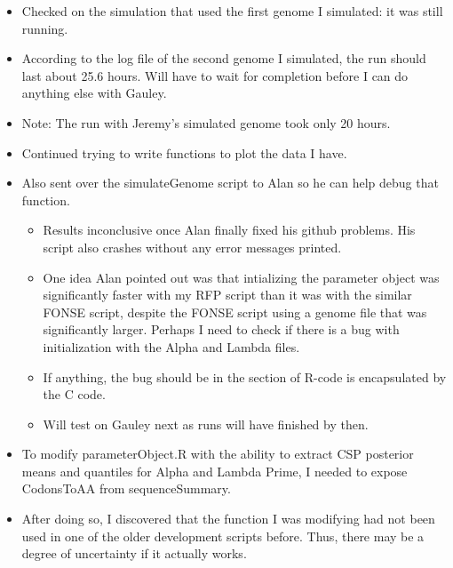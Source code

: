 \documentclass[12pt,hyperref]{labbook}
\begin{document}

\begin{itemize}
    \item Checked on the simulation that used the first genome I simulated: it was still running.
    \item According to the log file of the second genome I simulated, the run should last about 25.6 hours.
    Will have to wait for completion before I can do anything else with Gauley.
    \item Note: The run with Jeremy's simulated genome took only 20 hours.
    \item Continued trying to write functions to plot the data I have.
    \item Also sent over the simulateGenome script to Alan so he can help debug that function.
    \begin{itemize}
        \item Results inconclusive once Alan finally fixed his github problems.
        His script also crashes without any error messages printed.
        \item One idea Alan pointed out was that intializing the parameter object was significantly faster with my RFP script than it was with the similar FONSE script, despite the FONSE script using a genome file that was significantly larger.
        Perhaps I need to check if there is a bug with initialization with the Alpha and Lambda files.
        \item If anything, the bug should be in the section of R-code is encapsulated by the C code.
        \item Will test on Gauley next as runs will have finished by then.
    \end{itemize}
    \item To modify parameterObject.R with the ability to extract CSP posterior means and quantiles for Alpha and Lambda Prime, I needed to expose CodonsToAA from sequenceSummary.
    \item After doing so, I discovered that the function I was modifying had not been used in one of the older development scripts before.
    Thus, there may be a degree of uncertainty if it actually works.
\end{itemize}

\end{document}
